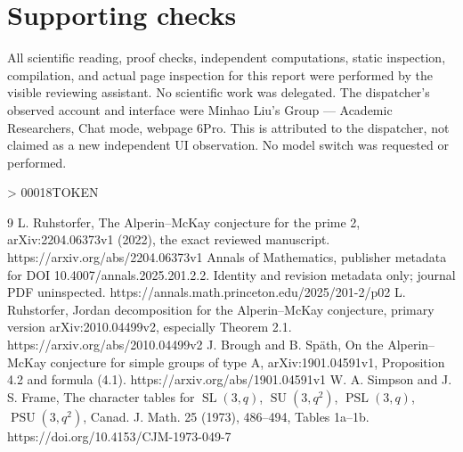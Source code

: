 \documentclass[10pt]{article}
\begin{document}
\section*{Supporting checks}
All scientific reading, proof checks, independent computations, static inspection, compilation, and actual page inspection for this report were performed by the visible reviewing assistant. No scientific work was delegated. The dispatcher’s observed account and interface were Minhao Liu’s Group — Academic Researchers, Chat mode, webpage 6Pro. This is attributed to the dispatcher, not claimed as a new independent UI observation. No model switch was requested or performed.\par
> 00018TOKEN\par
9 L. Ruhstorfer, The Alperin–McKay conjecture for the prime 2, arXiv:2204.06373v1 (2022), the exact reviewed manuscript. https://arxiv.org/abs/2204.06373v1 Annals of Mathematics, publisher metadata for DOI 10.4007/annals.2025.201.2.2. Identity and revision metadata only; journal PDF uninspected. https://annals.math.princeton.edu/2025/201-2/p02 L. Ruhstorfer, Jordan decomposition for the Alperin–McKay conjecture, primary version arXiv:2010.04499v2, especially Theorem 2.1. https://arxiv.org/abs/2010.04499v2 J. Brough and B. Späth, On the Alperin–McKay conjecture for simple groups of type A, arXiv:1901.04591v1, Proposition 4.2 and formula (4.1). https://arxiv.org/abs/1901.04591v1 W. A. Simpson and J. S. Frame, The character tables for \(\operatorname{SL}(3,q)\), \(\operatorname{SU}(3,q^2)\), \(\operatorname{PSL}(3,q)\), \(\operatorname{PSU}(3,q^2)\), Canad. J. Math. 25 (1973), 486–494, Tables 1a–1b. https://doi.org/10.4153/CJM-1973-049-7\par
\end{document}
